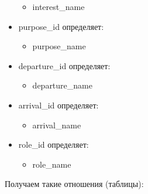 \begin{itemize}
\begin{itemize}
            \item interest\_name
        \end{itemize}
    \item purpose\_id определяет:
        \begin{itemize}
            \item purpose\_name
        \end{itemize}
    \item departure\_id определяет:
        \begin{itemize}
            \item departure\_name
        \end{itemize}
    \item arrival\_id определяет:
        \begin{itemize}
            \item arrival\_name
        \end{itemize}
    \item role\_id определяет:
        \begin{itemize}
            \item role\_name
        \end{itemize}
\end{itemize}

Получаем такие отношения (таблицы):

